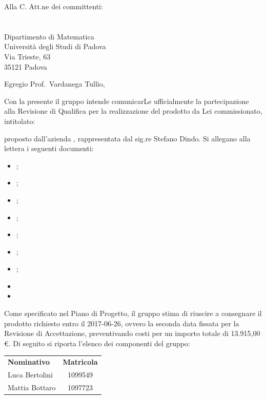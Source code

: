 \documentclass[a4paper,12pt]{letteracdp}
\date{2017-05-07}
\begin{document}
  \begin{letter}{
    Alla C. Att.ne dei committenti: \\
    \COMMITTENTE \\
    \CARDIN      \\
    Dipartimento di Matematica \\
		Università degli Studi di Padova \\
		Via Trieste, 63 \\
		35121 Padova}
		
    \opening{Egregio Prof.~Vardanega Tullio,}
    Con la presente il gruppo \GRUPPO{} intende comunicarLe ufficialmente la partecipazione alla Revisione di Qualifica per la realizzazione del prodotto da Lei commissionato, intitolato:
    \begin{center}
      \CAPITOLATO
    \end{center}
    proposto dall'azienda \PROPONENTE{}, rappresentata dal sig.re Stefano Dindo.
    Si allegano alla lettera i seguenti documenti:
    \begin{itemize}
      \item \Gldoc{} \Glfile{};
      \item \NPdoc{} \NPfile{};
      \item \PPdoc{} \PPfile{};
      \item \PQdoc{} \PQfile{};
      \item \ARdoc{} \ARfile{};
      \item \DPdoc{} \DPfile{};
      \item \MUdoc{} \MUfile{};
      \item {} 
      \item {} 
    \end{itemize}
    Come specificato nel Piano di Progetto, il gruppo stima di riuscire a
    consegnare il prodotto richiesto entro il 2017-06-26, ovvero la seconda data
    fissata per la Revisione di Accettazione, preventivando costi per un importo
    totale di 13.915,00 \euro.
    \newpage
    Di seguito si riporta l'elenco dei componenti del gruppo:\\
    \begin{center}
      \begin{tabular}{l c}
        \textbf{Nominativo} & \textbf{Matricola} \\
        Luca Bertolini 	 	& 1099549  \\
        Mattia Bottaro 	 	& 1097723  \\

\end{tabular}
\end{center}
\end{letter}
\end{document}
